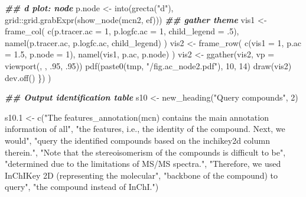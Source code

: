 \documentclass[
]{article}
\newenvironment{Shaded}{\begin{snugshade}}{\end{snugshade}}
\newcommand{\AttributeTok}[1]{\textcolor[rgb]{0.77,0.63,0.00}{#1}}
\newcommand{\DecValTok}[1]{\textcolor[rgb]{0.00,0.00,0.81}{#1}}
\newcommand{\DocumentationTok}[1]{\textcolor[rgb]{0.56,0.35,0.01}{\textbf{\textit{#1}}}}
\newcommand{\FloatTok}[1]{\textcolor[rgb]{0.00,0.00,0.81}{#1}}
\newcommand{\FunctionTok}[1]{\textcolor[rgb]{0.00,0.00,0.00}{#1}}
\newcommand{\NormalTok}[1]{#1}
\newcommand{\OtherTok}[1]{\textcolor[rgb]{0.56,0.35,0.01}{#1}}
\newcommand{\SpecialCharTok}[1]{\textcolor[rgb]{0.00,0.00,0.00}{#1}}
\newcommand{\StringTok}[1]{\textcolor[rgb]{0.31,0.60,0.02}{#1}}
\begin{document}
\begin{Shaded}
\begin{Highlighting}[]
    \DocumentationTok{\#\# d plot: node}
\NormalTok{    p.node }\OtherTok{\textless{}{-}} \FunctionTok{into}\NormalTok{(}\FunctionTok{grecta}\NormalTok{(}\StringTok{"d"}\NormalTok{), grid}\SpecialCharTok{::}\FunctionTok{grid.grabExpr}\NormalTok{(}\FunctionTok{show\_node}\NormalTok{(mcn2, ef)))}
    \DocumentationTok{\#\# gather theme}
\NormalTok{    vis1 }\OtherTok{\textless{}{-}} \FunctionTok{frame\_col}\NormalTok{(}
      \FunctionTok{c}\NormalTok{(}\AttributeTok{p.tracer.ac =} \DecValTok{1}\NormalTok{, }\AttributeTok{p.logfc.ac =} \DecValTok{1}\NormalTok{, }\AttributeTok{child\_legend =}\NormalTok{ .}\DecValTok{5}\NormalTok{),}
      \FunctionTok{namel}\NormalTok{(p.tracer.ac, p.logfc.ac, child\_legend)}
\NormalTok{    )}
\NormalTok{    vis2 }\OtherTok{\textless{}{-}} \FunctionTok{frame\_row}\NormalTok{(}
      \FunctionTok{c}\NormalTok{(}\AttributeTok{vis1 =} \DecValTok{1}\NormalTok{, }\AttributeTok{p.ac =} \FloatTok{1.5}\NormalTok{, }\AttributeTok{p.node =} \DecValTok{1}\NormalTok{),}
      \FunctionTok{namel}\NormalTok{(vis1, p.ac, p.node)}
\NormalTok{    )}
\NormalTok{    vis2 }\OtherTok{\textless{}{-}} \FunctionTok{ggather}\NormalTok{(vis2, }\AttributeTok{vp =} \FunctionTok{viewport}\NormalTok{(, , .}\DecValTok{95}\NormalTok{, .}\DecValTok{95}\NormalTok{))}
    \FunctionTok{pdf}\NormalTok{(}\FunctionTok{paste0}\NormalTok{(tmp, }\StringTok{"/fig.ac\_node2.pdf"}\NormalTok{), }\DecValTok{10}\NormalTok{, }\DecValTok{14}\NormalTok{)}
    \FunctionTok{draw}\NormalTok{(vis2)}
    \FunctionTok{dev.off}\NormalTok{()}
\NormalTok{  \})}
\NormalTok{)}

\DocumentationTok{\#\# Output identification table}
\NormalTok{s10 }\OtherTok{\textless{}{-}} \FunctionTok{new\_heading}\NormalTok{(}\StringTok{"Query compounds"}\NormalTok{, }\DecValTok{2}\NormalTok{)}

\NormalTok{s10}\FloatTok{.1} \OtherTok{\textless{}{-}} \FunctionTok{c}\NormalTok{(}\StringTok{"The \textasciigrave{}features\_annotation(mcn)\textasciigrave{} contains the main annotation information of all"}\NormalTok{,}
           \StringTok{"the features, i.e., the identity of the  compound. Next, we would"}\NormalTok{,}
           \StringTok{"query the identified compounds based on the \textquotesingle{}inchikey2d\textquotesingle{} column therein."}\NormalTok{,}
           \StringTok{"Note that the stereoisomerism of the compounds is difficult to be"}\NormalTok{,}
           \StringTok{"determined due to the limitations of MS/MS spectra."}\NormalTok{,}
           \StringTok{"Therefore, we used InChIKey 2D (representing the molecular"}\NormalTok{,}
           \StringTok{"backbone of the compound) to query"}\NormalTok{,}
           \StringTok{"the compound instead of InChI."}\NormalTok{)}


\end{Highlighting}
\end{Shaded}
\end{document}
